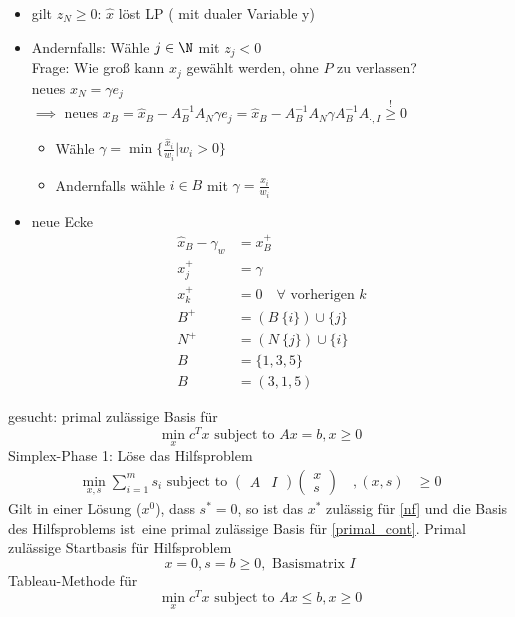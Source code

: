 \begin{itemize}
	\item gilt $z_{N} \geq 0$: $\hat{x}$ löst LP ( mit dualer Variable y)
	\item Andernfalls: Wähle $j\in \N$ mit $z_{j}<0$ \\
		Frage: Wie groß kann $x_{j}$ gewählt werden, ohne $P$ zu verlassen?\\
		neues $x_{N}= \gamma e_{j}$ \\
		$\implies$ neues $x_{B} = \hat{x}_{B}-A_{B}^{-1}A_{N}\gamma e_{j}= \hat{x}_{B}-A_{B}^{-1}A_{N}\gamma A_{B}^{-1}A_{\cdot,I} \overset{!}{\geq} 0$
		\begin{itemize}
			\item Wähle $\gamma = \min \{ \frac{\hat{x}_{i}}{w_{i}}|w_{i} > 0 \}$
			\item Andernfalls wähle $i \in B$ mit $\gamma = \frac{\hat{x}_{i}}{w_{i}}$
		\end{itemize} 
	\item neue Ecke
		\begin{align*}
			\hat{x}_{B}-\gamma_{w}&= x_{B}^+\\
			x_{j}^+& = \gamma\\
			x_{k}^+ &= 0 \quad \forall \text{ vorherigen } k\\
			B^+ &= (B \ \{i\})\cup \{j\}\\
			N^+ &= (N \ \{j\})\cup \{i\}\\
			B& = \{1,3,5\} \\
			B& = (3,1,5)
		\end{align*}
\end{itemize} 
gesucht: primal zulässige Basis für 
\begin{equation*}
	\min_{x} c^Tx \text{ subject to } Ax = b , x \geq 0
\end{equation*} 
Simplex-Phase 1: Löse das Hilfsproblem
\begin{align*}
	\min_{x,s} \sum_{i=1}^{m} s_{i} \text{ subject to }
	\begin{pmatrix}
		A& I
	\end{pmatrix}
	\begin{pmatrix}
		x \\ s
	\end{pmatrix}
	\quad,(x,s)& \geq 0
\end{align*} 
Gilt in einer Lösung ($x^0$), dass $s^* =0$, so ist das $x^*$ zulässig für \eqref{nf} und die Basis des Hilfsproblems \glqq ist\grqq\ eine primal zulässige Basis für \eqref{primal_cont}. 
Primal zulässige Startbasis für Hilfsproblem
\begin{equation*}
	x = 0, s = b \geq 0, \text{ Basismatrix } I
\end{equation*} 
Tableau-Methode für 
\begin{equation*}
	\min_{x}c^Tx \text{ subject to } Ax \leq b , x \geq 0
\end{equation*} 

